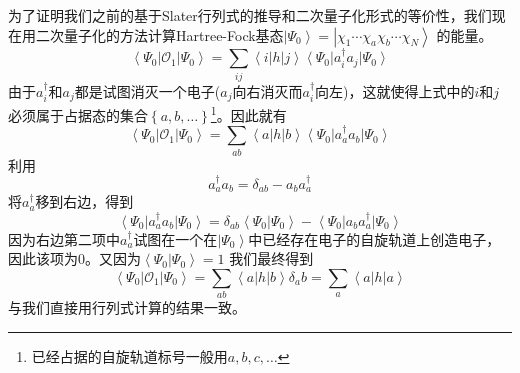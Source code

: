 \documentclass[12pt,a4paper,openany,twoside]{book}
\numberwithin{equation}{section}
\begin{document}
      为了证明我们之前的基于Slater行列式的推导和二次量子化形式的等价性，我们现在用二次量子化的方法计算Hartree-Fock基态$\left|\Psi_0\right\rangle=\left|\chi_1\cdots\chi_a\chi_b\cdots\chi_N\right\rangle$
      的能量。
      \begin{equation}
            \left\langle \Psi_0\right|\mathcal{O}_1\left|\Psi_0\right\rangle=
            \sum_{ij}\left\langle i\right| h\left| j\right\rangle\left\langle\Psi_0\right|
            a_i^\dagger a_j\left|\Psi_0\right\rangle
      \end{equation}
      由于$a_i^\dagger$和$a_j$都是试图消灭一个电子($a_j$向右消灭而$a_i^\dagger$向左)，这就使得上式中的$i$和$j$必须属于占据态的集合$\left\{a,b,\ldots\right\}$\footnote{已经占据的自旋轨道标号一般用$a,b,c,\dots$}。因此就有
      \begin{equation}
          \left\langle \Psi_0\right|\mathcal{O}_1\left|\Psi_0\right\rangle=
          \sum_{ab}\left\langle a\right| h\left| b\right\rangle\left\langle\Psi_0\right|
          a_a^\dagger a_b\left|\Psi_0\right\rangle
      \end{equation}
      利用
      \begin{equation}
          a_a^\dagger a_b=\delta_{ab}- a_b a_a^\dagger
      \end{equation}
      将$a_a^\dagger$移到右边，得到
      \begin{equation}
          \left\langle\Psi_0\right|a_a^\dagger a_b\left|\Psi_0\right\rangle=
          \delta_{ab}\left\langle\Psi_0\right|\left.\Psi_0\right\rangle
          -\left\langle\Psi_0\right|a_b a_a^\dagger\left|\Psi_0\right\rangle
      \end{equation}
      因为右边第二项中$a_a^\dagger$试图在一个在$\left|\Psi_0\right\rangle$中已经存在电子的自旋轨道上创造电子，因此该项为0。又因为$\left\langle\Psi_0\right.\left|\Psi_0\right\rangle=1$
      我们最终得到
      \begin{equation}
          \left\langle \Psi_0\right|\mathcal{O}_1\left|\Psi_0\right\rangle=
          \sum_{ab}\left\langle a\right| h\left| b\right\rangle\delta_ab=
          \sum_a\left\langle a\right| h\left| a\right\rangle
      \end{equation}
      与我们直接用行列式计算的结果一致。
      
\end{document}
